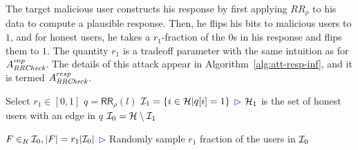 The target malicious user constructs his response by first applying $RR_\rho$ to his data to compute a plausible response. Then, he flips his bits to malicious users to $1$, and for honest users, he takes a $r_1$-fraction of the $0$s in his response and flips them to $1$. The quantity $r_1$ is a tradeoff parameter with the same intuition as for $A_{\textit{RRCheck}}^{inp}$. The details of this attack appear in Algorithm~\ref{alg:att-resp-inf}, and it is termed $A_{\textit{RRCheck}}^{resp}$.

%  
%  
%

\begin{algorithm}[bt]
	Select $r_1\in [0,1]$\;
	$q = \textsf{RR}_\rho (l)$\;
	$\mathcal{I}_1=\{i \in \mathcal{H}| q[i]=1\}$\;
  \hfill\textcolor{blue}{$\rhd$} $\mathcal{H}_1$ is the set of honest users with an edge in $q$\;
  $\mathcal{I}_0 = \mathcal{H} \setminus \mathcal{I}_1$\;

  $F\in_R \mathcal{I}_0, |F|=r_1|\mathcal{I}_0|$\;
  \hfill\textcolor{blue}{$\rhd$} Randomly sample $r_1$ fraction of the users in $\mathcal{I}_0$\;
  \caption{$A_{\DegRRCheck}^{resp}: \{0,1\}^n\mapsto\{0,1\}^n$ }\label{alg:att-resp-inf}
\end{algorithm}


